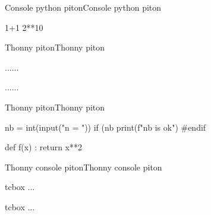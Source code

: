 \documentclass[a4paper,english,11pt]{article}
\begin{document}
\begin{myprestex}{Console python piton}{Console python piton}
\begin{pflpitonconsole}{}
1+1
2**10
\end{pflpitonconsole}
\end{myprestex}

\begin{myprestexcode}{Thonny piton}{Thonny piton}
\begin{pflpitonthonnyeditor}[<keys>]{...}...\end{pflpitonthonnyeditor}
\begin{PitonThonnyEditor}[<clés>]{...}...\end{PitonThonnyEditor}

\end{myprestexcode}

\begin{myprestex}{Thonny piton}{Thonny piton}
\begin{pflpitonthonnyeditor}[NomFichier=tpcapytale.py,Largeur=12cm]{}
nb = int(input("n = "))
if (nb %
	print(f"{nb} is ok")
#endif

def f(x) :
	return x**2
\end{pflpitonthonnyeditor}
\end{myprestex}

\begin{myprestexcode}{Thonny console piton}{Thonny console piton}
\begin{pflpitonthonnyconsole}[<keys>]{tcbox} ... \end{pflpitonthonnyconsole}
\begin{PitonThonnyConsole}[<clés>]{tcbox} ...    \end{PitonThonnyConsole}

\end{myprestexcode}
\end{document}
